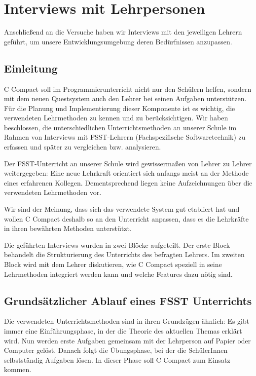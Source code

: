 \section{Interviews mit Lehrpersonen}
\label{sec:sci-interview}

Anschließend an die Versuche haben wir Interviews mit den jeweiligen Lehrern geführt, um unsere Entwicklungsumgebung deren Bedürfnissen anzupassen. 

\subsection{Einleitung}
C Compact soll im Programmierunterricht nicht nur den Schülern helfen, sondern mit dem neuen Questsystem auch den Lehrer bei seinen Aufgaben unterstützen. Für die Planung und Implementierung dieser Komponente ist es wichtig, die verwendeten Lehrmethoden zu kennen und zu berücksichtigen. Wir haben beschlossen, die unterschiedlichen Unterrichtsmethoden an unserer Schule im Rahmen von Interviews mit FSST-Lehrern (Fachspezifische Softwaretechnik) zu erfassen und später zu vergleichen bzw. analysieren. 

Der FSST-Unterricht an unserer Schule wird gewissermaßen von Lehrer zu Lehrer weitergegeben:
Eine neue Lehrkraft orientiert sich anfangs meist an der Methode eines erfahrenen Kollegen. Dementsprechend liegen keine Aufzeichnungen über die verwendeten Lehrmethoden vor. 

Wir sind der Meinung, dass sich das verwendete System gut etabliert hat und wollen C Compact deshalb so an den Unterricht anpassen, dass es die Lehrkräfte in ihren bewährten Methoden unterstützt.

Die geführten Interviews wurden in zwei Blöcke aufgeteilt. Der erste Block behandelt die Strukturierung des Unterrichts des befragten Lehrers. Im zweiten Block wird mit dem Lehrer diskutieren, wie C Compact speziell in seine Lehrmethoden integriert werden kann und welche Features dazu nötig sind.

\subsection{Grundsätzlicher Ablauf eines FSST Unterrichts}
Die verwendeten Unterrichtsmethoden sind in ihren Grundzügen ähnlich: Es gibt immer eine Einführungsphase, in der die Theorie des aktuellen Themas erklärt wird. Nun werden erste Aufgaben gemeinsam mit der Lehrperson auf Papier oder Computer gelöst. Danach folgt die Übungsphase, bei der die SchülerInnen selbstständig Aufgaben lösen. In dieser Phase soll C Compact zum Einsatz kommen.

